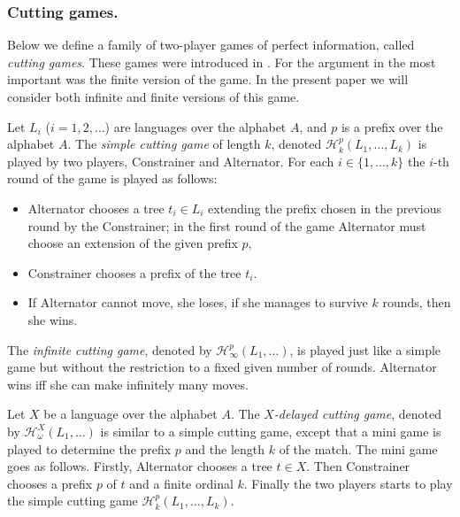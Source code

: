 \subsubsection*{Cutting games.}
Below we define a family of two-player games of perfect information, called \emph{cutting games}. These games were
introduced in \cite{bp}. For the argument in \cite{bp} the most important was the finite version of the game. In the present paper 
we will consider both infinite and finite versions of this game. %

Let $L_i$ ($i=1,2,\dots$) are languages over the alphabet $A$, and $p$ is a prefix over the alphabet $A$. 
The \emph{simple cutting game} of length $k$, denoted $\mathcal{H}^p_k(L_1,\ldots,L_k)$ is played by two players, Constrainer and Alternator. 
For each $i \in \{1, \dots, k \}$ the $i$-th round of the game is played as follows:
\begin{itemize}
\item Alternator chooses a tree $t_i \in L_i$ extending the prefix chosen in the previous round by the Constrainer; in the first round of the game Alternator must choose an extension of the given prefix $p$,
\item Constrainer chooses a prefix of the tree $t_i$.
\item If Alternator cannot move, she loses, if she manages to survive $k$ rounds, then she wins.
\end{itemize}
The \emph{infinite cutting game}, denoted by $\mathcal{H}^p_\infty(L_1,\dots)$, is played just like a simple game but without the restriction to a fixed given number of rounds. Alternator wins iff she can make infinitely many moves.

Let $X$ be a language over the alphabet $A$.  The \emph{$X$-delayed cutting game}, denoted by 
$\mathcal{H}^{X}_\omega(L_1,\dots)$ is similar to a simple cutting game, except that a mini game is played to determine the prefix $p$ and the length $k$ of the match. 
The mini game goes as follows. Firstly, Alternator chooses a tree $t \in X$. Then Constrainer chooses a prefix $p$ of $t$ and a finite ordinal $k$. Finally the two players starts to play the simple cutting game $\mathcal{H}^p_k(L_1,\dots,L_k)$. 

